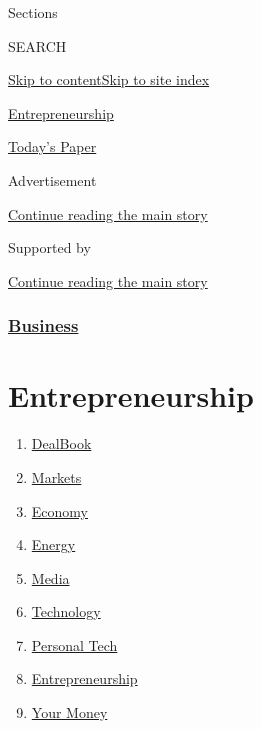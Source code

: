 Sections

SEARCH

\protect\hyperlink{site-content}{Skip to
content}\protect\hyperlink{site-index}{Skip to site index}

\href{https://www.nytimes3xbfgragh.onion/pages/business/smallbusiness/index.html}{Entrepreneurship}

\href{https://myaccount.nytimes3xbfgragh.onion/auth/login?response_type=cookie\&client_id=vi}{}

\href{https://www.nytimes3xbfgragh.onion/section/todayspaper}{Today's
Paper}

Advertisement

\protect\hyperlink{after-top}{Continue reading the main story}

Supported by

\protect\hyperlink{after-sponsor}{Continue reading the main story}

\hypertarget{business}{%
\subsubsection{\texorpdfstring{\href{/section/business}{Business}}{Business}}\label{business}}

\hypertarget{entrepreneurship}{%
\section{Entrepreneurship}\label{entrepreneurship}}

\begin{enumerate}
\def\labelenumi{\arabic{enumi}.}
\tightlist
\item
  \href{/pages/business/dealbook/index.html}{DealBook}
\item
  \href{https://markets.on.nytimes3xbfgragh.onion}{Markets}
\item
  \href{/section/business/economy}{Economy}
\item
  \href{/section/business/energy-environment}{Energy}
\item
  \href{/section/business/media}{Media}
\item
  \href{/section/technology}{Technology}
\item
  \href{/section/technology/personaltech}{Personal Tech}
\item
  \href{/section/business/smallbusiness}{Entrepreneurship}
\item
  \href{/section/your-money}{Your Money}
\end{enumerate}

